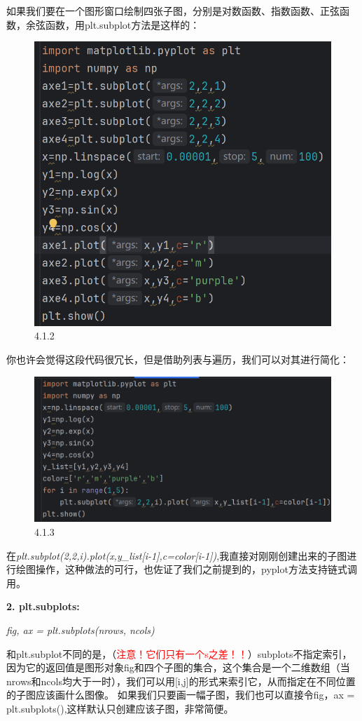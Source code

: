 \documentclass[12pt]{article}
\begin{document}
如果我们要在一个图形窗口绘制四张子图，分别是对数函数、指数函数、正弦函数，余弦函数，用plt.subplot方法是这样的：
\begin{figure}[H]
    \centering
    \includegraphics[width=0.65\linewidth]{创建子图 program1.png}
    \caption{4.1.2}
    \label{fig:enter-label}
\end{figure}
你也许会觉得这段代码很冗长，但是借助列表与遍历，我们可以对其进行简化：
\begin{figure}[H]
    \centering
    \includegraphics[width=0.75\linewidth]{创建子图 program1。2.png}
    \caption{4.1.3}
    \label{fig:enter-label}
\end{figure}
在\textit{plt.subplot(2,2,i).plot(x,y\_list[i-1],c=color[i-1])},我直接对刚刚创建出来的子图进行绘图操作，这种做法的可行，也佐证了我们之前提到的，pyplot方法支持链式调用。


\noindent\textbf{\large 2. plt.subplots:}

\textit{fig, ax = plt.subplots(nrows, ncols)}

和plt.subplot不同的是，（\textcolor{red}{注意！它们只有一个s之差！！}）subplots不指定索引，因为它的返回值是图形对象fig和四个子图的集合，这个集合是一个二维数组（当nrows和ncols均大于一时），我们可以用[i,j]的形式来索引它，从而指定在不同位置的子图应该画什么图像。
如果我们只要画一幅子图，我们也可以直接令fig，ax = plt.subplots(),这样默认只创建应该子图，非常简便。
\end{document}
